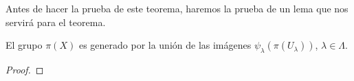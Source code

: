 \documentclass[12pt]{report}
\theoremstyle{largebreak}
\begin{document}
    Antes de hacer la prueba de este teorema, haremos la prueba de un lema que nos servirá para el teorema.

    \begin{lema}
        El grupo $\pi(X)$ es generado por la unión de las imágenes $\psi_\lambda\left(\pi(U_\lambda)\right)$, $\lambda\in\Lambda$.
    \end{lema}

    \begin{proof}
    \end{proof}
\end{document}
